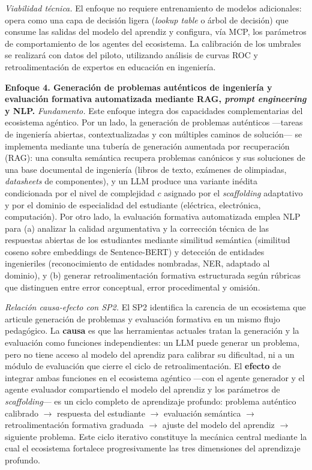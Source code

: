 \emph{Viabilidad técnica.}
El enfoque no requiere entrenamiento de modelos adicionales: opera como una capa de
decisión ligera (\emph{lookup table} o árbol de decisión) que consume las salidas del
modelo del aprendiz y configura, vía MCP, los parámetros de comportamiento de los
agentes del ecosistema. La calibración de los umbrales se realizará con datos del
piloto, utilizando análisis de curvas ROC y retroalimentación de expertos en
educación en ingeniería.

\medskip

\noindent\textbf{Enfoque 4. Generación de problemas auténticos de ingeniería y
evaluación formativa automatizada mediante RAG, \emph{prompt engineering} y NLP.}
\emph{Fundamento.}
Este enfoque integra dos capacidades complementarias del ecosistema agéntico. Por un
lado, la generación de problemas auténticos —tareas de ingeniería abiertas,
contextualizadas y con múltiples caminos de solución— se implementa mediante una
tubería de generación aumentada por recuperación (RAG): una consulta semántica
recupera problemas canónicos y sus soluciones de una base documental de ingeniería
(libros de texto, exámenes de olimpiadas, \emph{datasheets} de componentes), y un
LLM produce una variante inédita condicionada por el nivel de complejidad $c$
asignado por el \emph{scaffolding} adaptativo y por el dominio de especialidad del
estudiante (eléctrica, electrónica, computación). Por otro lado, la evaluación
formativa automatizada emplea NLP para (a) analizar la calidad argumentativa y la
corrección técnica de las respuestas abiertas de los estudiantes mediante similitud
semántica (similitud coseno sobre embeddings de Sentence-BERT) y detección de
entidades ingenieriles (reconocimiento de entidades nombradas, NER, adaptado al
dominio), y (b) generar retroalimentación formativa estructurada según rúbricas que
distinguen entre error conceptual, error procedimental y omisión.

\emph{Relación causa-efecto con SP2.}
El SP2 identifica la carencia de un ecosistema que articule generación de problemas y
evaluación formativa en un mismo flujo pedagógico. La \textbf{causa} es que las
herramientas actuales tratan la generación y la evaluación como funciones
independientes: un LLM puede generar un problema, pero no tiene acceso al modelo del
aprendiz para calibrar su dificultad, ni a un módulo de evaluación que cierre el
ciclo de retroalimentación. El \textbf{efecto} de integrar ambas funciones en el
ecosistema agéntico —con el agente generador y el agente evaluador compartiendo el
modelo del aprendiz y los parámetros de \emph{scaffolding}— es un ciclo completo de
aprendizaje profundo: problema auténtico calibrado $\to$ respuesta del estudiante
$\to$ evaluación semántica $\to$ retroalimentación formativa graduada $\to$ ajuste
del modelo del aprendiz $\to$ siguiente problema. Este ciclo iterativo constituye la
mecánica central mediante la cual el ecosistema fortalece progresivamente las tres
dimensiones del aprendizaje profundo.

